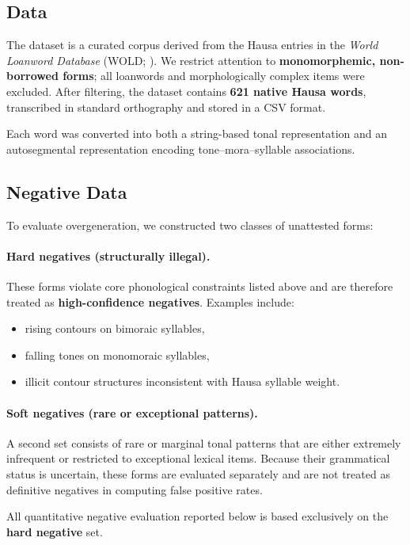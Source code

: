 \documentclass[11pt]{article}
\begin{document}
\subsection{Data}

The dataset is a curated corpus derived from the Hausa entries in the \textit{World Loanword Database} (WOLD; \citealt{wold}). We restrict attention to \textbf{monomorphemic, non-borrowed forms}; all loanwords and morphologically complex items were excluded.
 After filtering, the dataset contains \textbf{621 native Hausa words}, transcribed in standard orthography and stored in a CSV format.

Each word was converted into both a string-based tonal representation and an autosegmental representation encoding tone–mora–syllable associations.

\subsection{Negative Data}

To evaluate overgeneration, we constructed two classes of unattested forms:

\paragraph{Hard negatives (structurally illegal).}
These forms violate core phonological constraints listed above and are therefore treated as \textbf{high-confidence negatives}. Examples include:
\begin{itemize}
    \item rising contours on bimoraic syllables,
    \item falling tones on monomoraic syllables,
    \item illicit contour structures inconsistent with Hausa syllable weight.
\end{itemize}

\paragraph{Soft negatives (rare or exceptional patterns).}
A second set consists of rare or marginal tonal patterns that are either extremely infrequent or restricted to exceptional lexical items. Because their grammatical status is uncertain, these forms are evaluated separately and are not treated as definitive negatives in computing false positive rates.

All quantitative negative evaluation reported below is based exclusively on the \textbf{hard negative} set.
\end{document}
